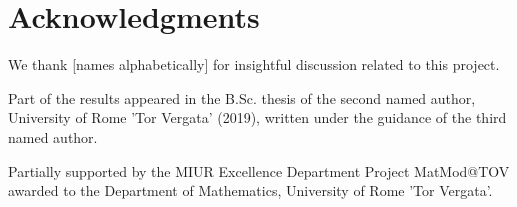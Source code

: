 
\section*{Acknowledgments}

We thank [names alphabetically] for insightful discussion related to this project.

Part of the results appeared in the B.Sc. thesis of the second named author, University of Rome 'Tor Vergata' (2019), written under the guidance of the third named author.

Partially supported by  the MIUR Excellence Department Project
MatMod@TOV awarded to the Department of Mathematics, University of Rome
'Tor Vergata'.
